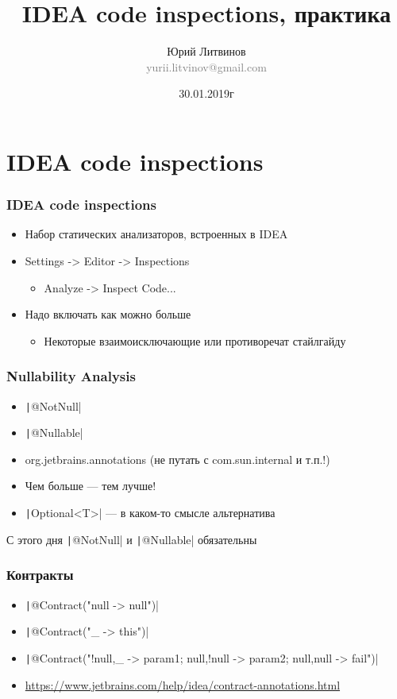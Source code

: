 \documentclass[xetex,mathserif,serif]{beamer}
\title{IDEA code inspections, практика}
\author[Юрий Литвинов]{Юрий Литвинов\\\small{\textcolor{gray}{yurii.litvinov@gmail.com}}}
\date{30.01.2019г}
\begin{document}
	\frame{\titlepage}

	\section{IDEA code inspections}

	\begin{frame}
		\frametitle{IDEA code inspections}
		\begin{itemize}
			\item Набор статических анализаторов, встроенных в IDEA
			\item Settings -> Editor -> Inspections
			\begin{itemize}
				\item Analyze -> Inspect Code...
			\end{itemize}
			\item Надо включать как можно больше
			\begin{itemize}
				\item Некоторые взаимоисключающие или противоречат стайлгайду
			\end{itemize}
		\end{itemize}
	\end{frame}

	\begin{frame}
		\frametitle{Nullability Analysis}
		\begin{itemize}
			\item \texttt|@NotNull|
			\item \texttt|@Nullable|
			\item org.jetbrains.annotations (не путать с com.sun.internal и т.п.!)
			\item Чем больше --- тем лучше!
			\item \texttt|Optional<T>| --- в каком-то смысле альтернатива
		\end{itemize}
		С этого дня \texttt|@NotNull| и \texttt|@Nullable| обязательны
	\end{frame}

	\begin{frame}
		\frametitle{Контракты}
		\begin{itemize}
			\item \texttt|@Contract("null -> null")|
			\item \texttt|@Contract("_ -> this")|
			\item \texttt|@Contract("!null,_ -> param1; null,!null -> param2; null,null -> fail")|
			\item \url{https://www.jetbrains.com/help/idea/contract-annotations.html}
		\end{itemize}
	\end{frame}
\end{document}
